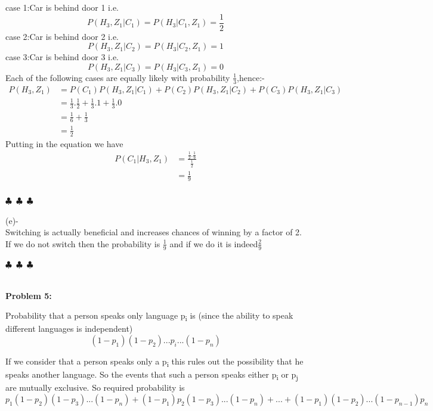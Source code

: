 \documentclass[a4paper]{article}
\begin{document}
\indent case 1:Car is behind door 1 i.e.\\
$$P(H_3,Z_1|C_1)=P(H_3|C_1,Z_1)=\frac{1}{2}$$
\indent case 2:Car is behind door 2 i.e.\\
$$P(H_3,Z_1|C_2)=P(H_3|C_2,Z_1)=1$$
\indent case 3:Car is behind door 3 i.e.\\
$$P(H_3,Z_1|C_3)=P(H_3|C_3,Z_1)=0$$
Each of the following cases are equally likely with probability $\frac{1}{3}$,hence:-\\
\begin{equation*}
\begin{split}
P(H_3,Z_1)&=P(C_1)P(H_3,Z_1|C_1)+P(C_2)P(H_3,Z_1|C_2)+P(C_3)P(H_3,Z_1|C_3)\\
&=\frac{1}{3}.\frac{1}{2}+\frac{1}{3}.1+\frac{1}{3}.0\\
&=\frac{1}{6}+\frac{1}{3}\\
&=\frac{1}{2}
\end{split}
\end{equation*}
Putting in the equation we have
\begin{equation*}
\begin{split}
P(C_1|H_3,Z_1)&=\frac{\frac{1}{2}.\frac{1}{9}}{\frac{1}{2}}\\
&=\frac{1}{9}\\
\end{split}
\end{equation*}
\begin{center}
  $\clubsuit$~$\clubsuit$~$\clubsuit$
\end{center}
(e)-\\
Switching is actually beneficial and increases chances of winning by a factor of 2. If we do not switch then the probability is $\frac{1}{9}$ and if we do it is indeed$\frac{2}{9}$\\
\begin{center}
  $\clubsuit$~$\clubsuit$~$\clubsuit$
\end{center}
\hrulefill \\
\textbf{Problem 5:}

Probability that a person speaks only language p\textsubscript{i} is 
 (since the ability to speak different languages is independent)
$$ (1-p_1)(1-p_2)...p_i...(1-p_n) $$

If we consider that a person speaks only a p\textsubscript{i} this rules out the possibility that he speaks another language. So the events that such a person speaks either p\textsubscript{i} or p\textsubscript{j} are mutually exclusive. So required probability is
$$ p_1(1-p_2)(1-p_3)...(1-p_n)+(1-p_1)p_2(1-p_3)...(1-p_n)+...+(1-p_1)(1-p_2)...(1-p_{n-1})p_n$$
\end{document}
